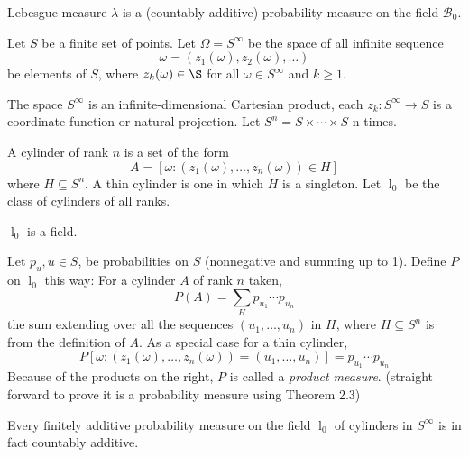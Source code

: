 \documentclass[12pt]{article}
\newcommand{\B}{\mathcal{B}}
\newcommand{\lc}{\mathop l}
\newcommand{\seq}{\subseteq}
\newcommand{\om}{\omega}
\newcommand{\Om}{\Omega}
\newenvironment{theorem}[2][Theorem]{\begin{trivlist}
\item[\hskip \labelsep {\bfseries #1}\hskip \labelsep {\bfseries #2.}]}{\end{trivlist}}
\newenvironment{defn}[2][Definition]{\begin{trivlist}
\item[\hskip \labelsep {\bfseries #1}\hskip \labelsep {\bfseries #2.}]}{\end{trivlist}}
\newenvironment{rmrk}[2][Remark]{\begin{trivlist}
\item[\hskip \labelsep {\bfseries #1}\hskip \labelsep {\bfseries #2.}]}{\end{trivlist}}
\begin{document}
\begin{theorem}{2.2}
    Lebesgue measure $\lambda$ is a (countably additive) probability measure on the field $\B_0$.
\end{theorem}

\begin{defn}{13}
    Let $S$ be a finite set of points. Let $\Om = S^{\infty}$ be the space of all infinite sequence
    \[ \om = (z_1 (\om), z_2 (\om), \ldots) \]
    be elements of $S$, where $z_k (\om) \in \S$ for all $\om \in S^{\infty}$ and $k \geq 1$.
\end{defn}

\begin{rmrk}{14}
    The space $S^{\infty}$ is an infinite-dimensional Cartesian product, each $z_k: S^{\infty} \to S$ is a coordinate function or natural projection. Let $S^{n} = S \times \cdots \times S$ n times.
\end{rmrk}

\begin{defn}{15}
    A cylinder of rank $n$ is a set of the form
    \[ A = [ \om : (z_1 (\om), \ldots, z_n (\om)) \in H] \]
    where $H \seq S^n$. A thin cylinder is one in which $H$ is a singleton. Let $\lc_0$ be the class of cylinders of all ranks.
\end{defn}

\begin{rmrk}{16}
    $\lc_0$ is a field.
\end{rmrk}


\begin{defn}{17}
    Let $p_u, u \in S$, be probabilities on $S$ (nonnegative and summing up to 1). Define $P$ on $\lc_0$ this way: For a cylinder $A$ of rank $n$ taken,
    \[ P(A) = \sum_{H} p_{u_1} \cdots p_{u_n} \]
    the sum extending over all the sequences $(u_1, \ldots, u_n)$ in $H$, where $H \seq S^n$ is from the definition of $A$. As a special case for a thin cylinder,
    \[ P[\om : (z_1 (\om), \ldots, z_n (\om)) = (u_1, \ldots, u_n)] = p_{u_1} \cdots p_{u_n} \]
    Because of the products on the right, $P$ is called a \emph{product measure}. (straight forward to prove it is a probability measure using Theorem 2.3)
\end{defn}

\begin{theorem}{2.3}
    Every finitely additive probability measure on the field $\lc_0$ of cylinders in $S^{\infty}$ is in fact countably additive.
\end{theorem}
\end{document}
